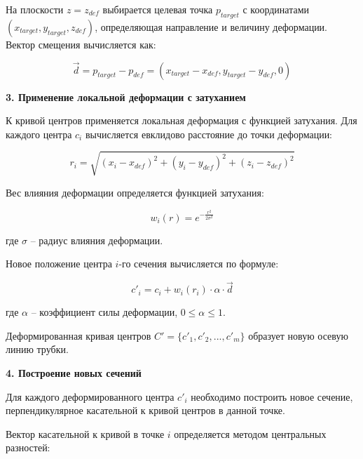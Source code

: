 \noindent
\hspace{1.25cm}
На плоскости $z = z_{def}$ выбирается целевая точка $p_{target}$ с координатами $(x_{target}, y_{target}, z_{def})$, определяющая направление и величину деформации. Вектор смещения вычисляется как:

\begin{equation}
\vec{d} = p_{target} - p_{def} = (x_{target} - x_{def}, y_{target} - y_{def}, 0)
\end{equation}

\noindent
\textbf{3. Применение локальной деформации с затуханием}

\noindent
\hspace{1.25cm}
К кривой центров применяется локальная деформация с функцией затухания. Для каждого центра $c_i$ вычисляется евклидово расстояние до точки деформации:

\begin{equation}
r_i = \sqrt{(x_i - x_{def})^2 + (y_i - y_{def})^2 + (z_i - z_{def})^2}
\end{equation}

\noindent
\hspace{1.25cm}
Вес влияния деформации определяется функцией затухания:

\begin{equation}
w_i(r) = e^{-\frac{r^2}{2\sigma^2}}
\end{equation}

где $\sigma$ -- радиус влияния деформации.

\noindent
\hspace{1.25cm}
Новое положение центра $i$-го сечения вычисляется по формуле:

\begin{equation}
c'_i = c_i + w_i(r_i) \cdot \alpha \cdot \vec{d}
\end{equation}

где $\alpha$ -- коэффициент силы деформации, $0 \leq \alpha \leq 1$.

\noindent
\hspace{1.25cm}
Деформированная кривая центров $C' = \{c'_1, c'_2, ..., c'_m\}$ образует новую осевую линию трубки.

\noindent
\textbf{4. Построение новых сечений}

\noindent
\hspace{1.25cm}
Для каждого деформированного центра $c'_i$ необходимо построить новое сечение, перпендикулярное касательной к кривой центров в данной точке.

\noindent
\hspace{1.25cm}
Вектор касательной к кривой в точке $i$ определяется методом центральных разностей:

